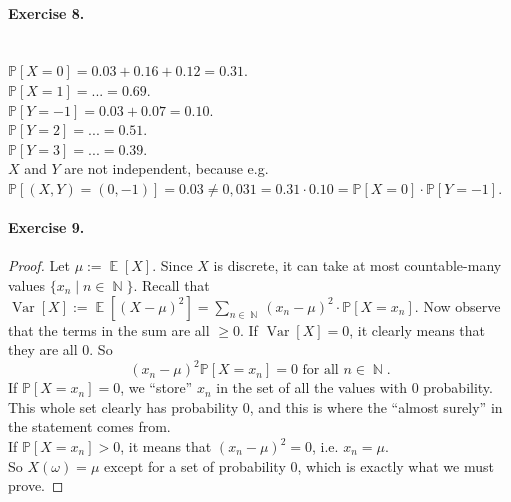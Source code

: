 \documentclass[12pt,a4paper]{report}
\theoremstyle{definition}
\theoremstyle{num.custom-title}
\DeclareMathOperator{\E}{\mathbb{E}}
\DeclareMathOperator{\N}{\mathbb{N}}
\DeclareMathOperator{\Var}{Var}
\renewcommand{\1}{\mathbbm{1}}
\renewcommand{\P}{\mathbb{P}}
\begin{document}
\paragraph{Exercise 8.}\
\\
$\P[X=0] = 0.03 + 0.16 + 0.12 = 0.31$.\\
$\P[X=1] = ... = 0.69$.\\
$\P[Y=-1] = 0.03 + 0.07 = 0.10$.\\
$\P[Y=2] = ... = 0.51$.\\
$\P[Y=3] = ... = 0.39$.\\
$X$ and $Y$ are not independent, because e.g. $\P[(X,Y)=(0,-1)] = 0.03 \neq 0,031 = 0.31 \cdot 0.10 = \P[X=0] \cdot \P[Y=-1]$.

\paragraph{Exercise 9.}
\begin{proof}
Let $\mu := \E[X]$. Since $X$ is discrete, it can take at most countable-many values $\{x_n \mid n \in \N\}$. Recall that $\Var[X] := \E[(X-\mu)^2] = \sum_{n \in \N} (x_n-\mu)^2 \cdot \P[X=x_n]$. %
Now observe that the terms in the sum are all $\geq 0$. If $\Var[X]=0$, it clearly means that they are all $0$. So
\[
(x_n - \mu)^2 \P[X=x_n] = 0 \text{ for all } n \in \N.
\]
If $\P[X=x_n]=0$, we ``store'' $x_n$ in the set of all the values with $0$ probability. This whole set clearly has probability $0$, and this is where the ``almost surely'' in the statement comes from.\\
If $\P[X=x_n]>0$, it means that $(x_n - \mu)^2=0$, i.e. $x_n = \mu$.\\
So $X(\omega) = \mu$ except for a set of probability $0$, which is exactly what we must prove.
\end{proof}
\end{document}
